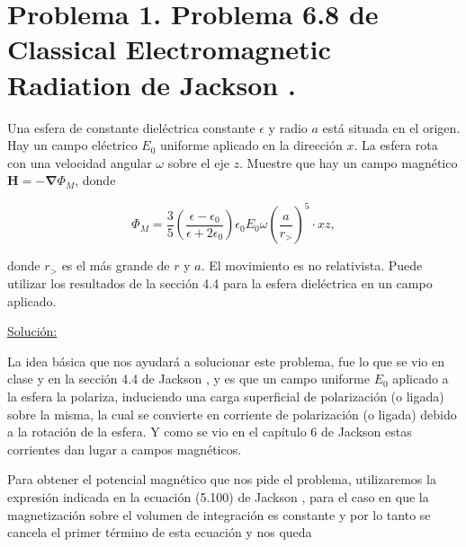 \documentclass[a4paper,11pt]{article}
\numberwithin{equation}{section}
\renewcommand{\thefootnote}{\fnsymbol{footnote}}
\begin{document}
\fancyhead[R]{\thepage}

\setcounter{footnote}{0}
\renewcommand*{\thefootnote}{\arabic{footnote}}


\section{Problema 1. Problema 6.8 de Classical Electromagnetic Radiation
de Jackson \cite{jackson}.}

Una esfera de constante dieléctrica constante $\epsilon$ y radio $a$ está situada 
en el origen. Hay un campo eléctrico $E_0$ uniforme aplicado en la dirección $x$. 
La esfera rota con una velocidad angular $\omega$ sobre el eje $z$. Muestre que 
hay un campo magnético $\mathbf{H} = - \mathbf{\nabla} \Phi_M$, donde 

$$
\Phi_M = \frac{3}{5}\left(\frac{\epsilon - \epsilon_0}{\epsilon + 2\epsilon_0}\right)
\epsilon_0E_0\omega\left(\frac{a}{r_>}\right)^5\cdot xz,
$$

donde $r_>$ es el más grande de $r$ y $a$. El movimiento es no relativista. Puede 
utilizar los resultados de la sección 4.4 para la esfera dieléctrica en un campo 
aplicado.

\vspace{.3cm}

\underline{Solución:} \vspace{.3cm}

La idea básica que nos ayudará a solucionar este problema, fue lo que se vio en 
clase y en la sección 4.4 de Jackson \cite{jackson}, y es que un campo uniforme
$E_0$ aplicado a la esfera la polariza, induciendo una carga superficial de 
polarización (o ligada) sobre la misma, la cual se convierte en corriente de 
polarización (o ligada) debido a la rotación de la esfera. Y como se vio en el 
capítulo 6 de Jackson \cite{jackson} estas corrientes dan lugar a campos 
magnéticos.

\vspace{.3cm}

Para obtener el potencial magnético que nos pide el problema, utilizaremos la expresión 
indicada en la ecuación (5.100) de Jackson \cite{jackson}, para el caso en que 
la magnetización sobre el volumen de integración es constante y por lo tanto 
se cancela el primer término de esta ecuación y nos queda 
\end{document}
